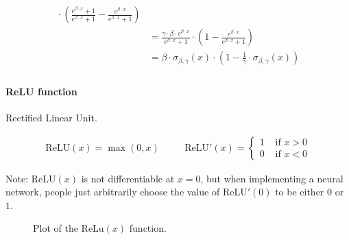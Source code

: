 \documentclass{article}
\begin{document}
\begin{align*}
{                  }
                  \cdot
                  \left(
                    \frac{e^{\beta \cdot x} + 1}{e^{\beta \cdot x} + 1}
                    -
                    \frac{e^{\beta \cdot x}}{e^{\beta \cdot x} + 1}
                  \right) \\
              & = \frac{
                    \gamma \cdot \beta \cdot e^{\beta \cdot x}
                  }{
                    e^{\beta \cdot x} + 1
                  }
                  \cdot
                  \left(
                    1 - \frac{e^{\beta \cdot x}}{e^{\beta \cdot x} + 1}
                  \right) \\
              & = \beta \cdot \sigma_{\beta, \gamma} (x)
                  \cdot
                  \left(
                    1 - \frac{1}{\gamma} \cdot \sigma_{\beta, \gamma} (x)
                  \right) \\
          \end{align*}

        \paragraph{ReLU function}

          Rectified Linear Unit.

          \begin{align*}
            \text{ReLU} (x) = \max(0, x)
            & \quad &
            \text{ReLU}' (x) =
              \begin{cases}
                1 & \text{ if } x > 0 \\
                0 & \text{ if } x < 0
              \end{cases}
          \end{align*}

          Note: $\text{ReLU}(x)$ is not differentiable at $x=0$, but when
          implementing a neural network, people just arbitrarily choose the
          value of $\text{ReLU}'(0)$ to be either $0$ or $1$.

          \begin{figure}[!htb]
            \centering
            \caption{%
              Plot of the $\text{ReLu}(x)$ function.
            }
          \end{figure}
\end{document}
